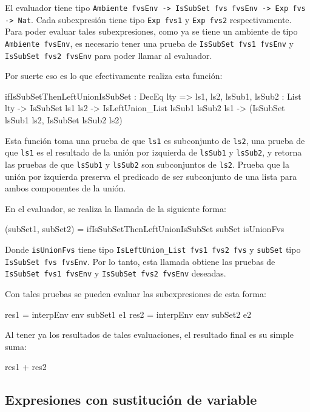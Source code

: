 El evaluador tiene tipo \texttt{Ambiente fvsEnv -> IsSubSet fvs fvsEnv -> Exp fvs -> Nat}. Cada subexpresión tiene tipo \texttt{Exp fvs1} y \texttt{Exp fvs2} respectivamente. Para poder evaluar tales subexpresiones, como ya se tiene un ambiente de tipo \texttt{Ambiente fvsEnv}, es necesario tener una prueba de \texttt{IsSubSet fvs1 fvsEnv} y \texttt{IsSubSet fvs2 fvsEnv} para poder llamar al evaluador.

Por suerte eso es lo que efectivamente realiza esta función:

\begin{code}
ifIsSubSetThenLeftUnionIsSubSet : DecEq lty =>
  {ls1, ls2, lsSub1, lsSub2 : List lty} -> IsSubSet ls1 ls2 ->
  IsLeftUnion_List lsSub1 lsSub2 ls1 ->
  (IsSubSet lsSub1 ls2, IsSubSet lsSub2 ls2)
\end{code}

Esta función toma una prueba de que \texttt{ls1} es subconjunto de \texttt{ls2}, una prueba de que \texttt{ls1} es el resultado de la unión por izquierda de \texttt{lsSub1} y \texttt{lsSub2}, y retorna las pruebas de que \texttt{lsSub1} y \texttt{lsSub2} son subconjuntos de \texttt{ls2}. Prueba que la unión por izquierda preserva el predicado de ser subconjunto de una lista para ambos componentes de la unión.

En el evaluador, se realiza la llamada de la siguiente forma:

\begin{code}
(subSet1, subSet2) =
  ifIsSubSetThenLeftUnionIsSubSet subSet isUnionFvs
\end{code}

Donde \texttt{isUnionFvs} tiene tipo \texttt{IsLeftUnion\_List fvs1 fvs2 fvs} y \texttt{subSet} tipo \texttt{IsSubSet fvs fvsEnv}. Por lo tanto, esta llamada obtiene las pruebas de \texttt{IsSubSet fvs1 fvsEnv} y \texttt{IsSubSet fvs2 fvsEnv} deseadas.

Con tales pruebas se pueden evaluar las subexpresiones de esta forma:

\begin{code}
res1 = interpEnv env subSet1 e1
res2 = interpEnv env subSet2 e2
\end{code}

Al tener ya los resultados de tales evaluaciones, el resultado final es su simple suma:

\begin{code}
res1 + res2
\end{code}

\subsection{Expresiones con sustitución de variable}

